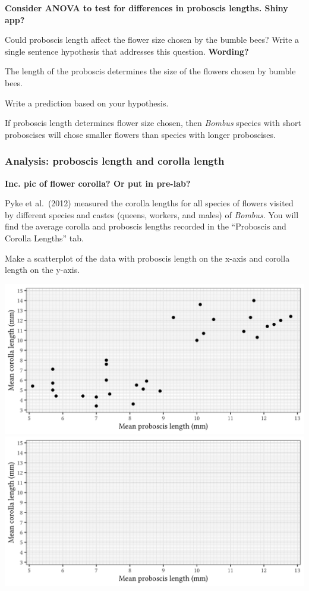 \documentclass[12pt, hidelinks]{exam}
\newcommand*\AnswerBox[2]{%
    \parbox[t][#1]{0.92\textwidth}{%
    \begin{solution}#2\end{solution}}
    \vspace{\stretch{1}}
}
\begin{document}
\begin{questions}
\textbf{Consider ANOVA to test for differences in proboscis lengths. 
	Shiny app?}

\bigskip

\question
Could proboscis length affect the flower size chosen by the bumble bees? Write a single sentence hypothesis that addresses this question. \textbf{Wording?}

\AnswerBox{2\baselineskip}{The length of the proboscis determines the size
	of the flowers chosen by bumble bees.}

\question
Write a prediction based on your hypothesis.

\AnswerBox{3\baselineskip}{If proboscis length determines flower size chosen, then \textit{Bombus} species with short proboscises will chose smaller flowers than species with longer proboscises.}


\subsubsection*{Analysis: proboscis length and corolla length}\label{sec:proboscis_flower_length}

\textbf{Inc. pic of flower corolla? Or put in pre-lab?}

Pyke et al.~(2012) measured the corolla lengths for all species of flowers visited by different species and castes (queens, workers, and males) of \textit{Bombus.} You will find the average corolla and proboscis lengths recorded in the “Proboscis and Corolla Lengths” tab. 

\question
Make a scatterplot of the data with proboscis length on the x-axis and corolla length on the y-axis.

\ifprintanswers
	\includegraphics[width=\textwidth]{proboscis_corolla_key}
\else
	\includegraphics[width=\textwidth]{proboscis_corolla_blank}
\fi


\end{questions}
\end{document}

